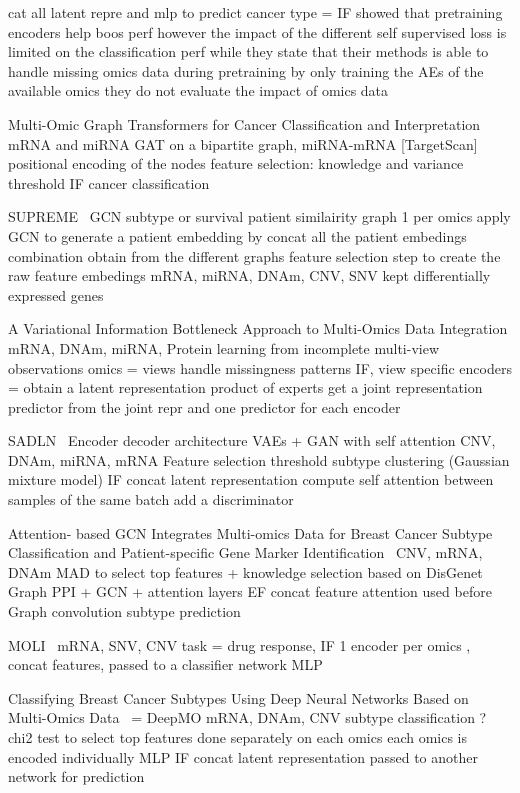 \documentclass[../main.tex]{subfiles}
\begin{document}
cat all latent repre and mlp to predict cancer type = IF 
showed that pretraining encoders help boos perf however the impact of the different self supervised loss is limited on the classification perf 
while they state that their methods is able to handle missing omics data during pretraining by only training the AEs of the available omics they do not evaluate the impact of omics data


Multi-Omic Graph Transformers for Cancer Classification and Interpretation~\cite{Kaczmarek2021}
mRNA and miRNA 
GAT on a bipartite graph, miRNA-mRNA [TargetScan]
positional encoding of the nodes 
feature selection: knowledge and variance threshold 
IF  cancer classification 

SUPREME~\cite{Kesimoglu2022} GCN subtype or survival patient similairity graph 1 per omics 
apply GCN to generate a patient embedding by concat all the patient embedings combination obtain from the different graphs 
feature selection step to create the raw feature embedings
mRNA, miRNA, DNAm, CNV, SNV
kept differentially expressed genes 

A Variational Information Bottleneck Approach to Multi-Omics Data Integration
\cite{Lee2021AVI}
mRNA, DNAm, miRNA, Protein
learning from incomplete multi-view observations
omics = views handle missingness patterns
IF, view specific encoders = obtain a latent representation 
product of experts get a joint representation
predictor from the joint repr and one predictor for each encoder

SADLN~\cite{SADLN} Encoder decoder architecture VAEs + GAN with self attention
CNV, DNAm, miRNA, mRNA
Feature selection threshold
subtype clustering (Gaussian mixture model)
IF concat latent representation
compute self attention between samples of the same batch
add a discriminator  

Attention- based GCN Integrates Multi-omics Data for Breast Cancer Subtype Classification and Patient-specific Gene Marker Identification~\cite{Guo2023}
CNV, mRNA, DNAm 
MAD to select top features + knowledge selection based on DisGenet
Graph PPI + GCN + attention layers 
EF concat feature
attention used before Graph convolution
subtype prediction 

MOLI~\cite{MOLI}
mRNA, SNV, CNV
task = drug response, IF
1 encoder per omics , concat features, passed to a classifier network 
MLP

Classifying Breast Cancer Subtypes Using Deep Neural Networks Based on Multi-Omics Data~\cite{Lin2020} = DeepMO
mRNA, DNAm, CNV 
subtype classification ?
chi2 test to select top features done separately on each omics
each omics is encoded individually MLP
IF concat latent representation 
passed to another network for prediction
\end{document}
